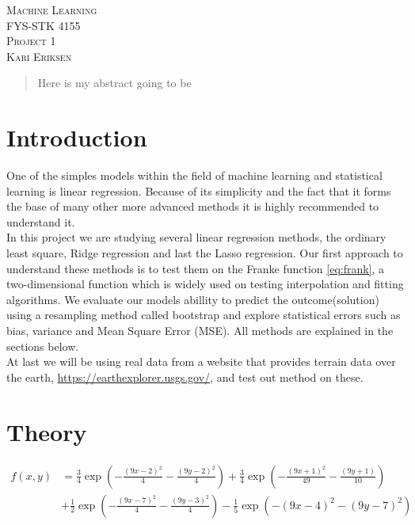 \documentclass[a4paper,12pt, english]{article}
\begin{document}
\begin{titlepage}
\begin{center}
\textsc{\Large Machine Learning}\\[0.2cm]
\textsc{FYS-STK 4155}\\[1.0cm]
\textsc{\Large Project 1}\\[0.2cm]
\textsc{Kari Eriksen}\\[1.0cm]

\begin{abstract}
Here is my abstract going to be
\end{abstract}

\end{center}
\end{titlepage}

\section*{Introduction}

One of the simples models within the field of machine learning and statistical learning is linear regression. Because of its simplicity and the fact that it forms the base of many other more advanced methods it is highly recommended to understand it. \\ 
In this project we are studying several linear regression methods, the ordinary least square, Ridge regression and last the Lasso regression. Our first approach to understand these methods is to test them on the Franke function \ref{eq:frank}, a two-dimensional function which is widely used on testing interpolation and fitting algorithms. 
We evaluate our models abillity to predict the outcome(solution) using a resampling method called bootstrap and explore statistical errors such as bias, variance and Mean Square Error (MSE). All methods are explained in the sections below. \\
At last we will be using real data from a website that provides terrain data over the earth, \href{https://earthexplorer.usgs.gov/}{https://earthexplorer.usgs.gov/}, and test out method on these. 

 

\section*{Theory}

\begin{align}
f(x,y) &= \frac{3}{4}\exp{\left(-\frac{(9x-2)^2}{4} - \frac{(9y-2)^2}{4}\right)}+\frac{3}{4}\exp{\left(-\frac{(9x+1)^2}{49}- \frac{(9y+1)}{10}\right)} \nonumber \\
&+\frac{1}{2}\exp{\left(-\frac{(9x-7)^2}{4} - \frac{(9y-3)^2}{4}\right)} -\frac{1}{5}\exp{\left(-(9x-4)^2 - (9y-7)^2\right) } \label{eq:frank}
\end{align}
\end{document}
